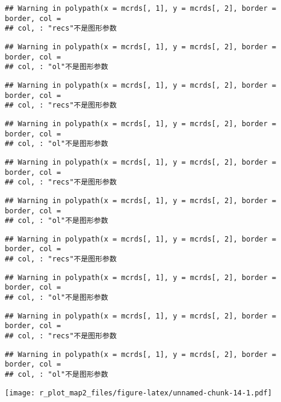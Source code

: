 \documentclass[]{article}
\begin{document}
\begin{verbatim}
## Warning in polypath(x = mcrds[, 1], y = mcrds[, 2], border = border, col =
## col, : "recs"不是图形参数
\end{verbatim}

\begin{verbatim}
## Warning in polypath(x = mcrds[, 1], y = mcrds[, 2], border = border, col =
## col, : "ol"不是图形参数
\end{verbatim}

\begin{verbatim}
## Warning in polypath(x = mcrds[, 1], y = mcrds[, 2], border = border, col =
## col, : "recs"不是图形参数
\end{verbatim}

\begin{verbatim}
## Warning in polypath(x = mcrds[, 1], y = mcrds[, 2], border = border, col =
## col, : "ol"不是图形参数
\end{verbatim}

\begin{verbatim}
## Warning in polypath(x = mcrds[, 1], y = mcrds[, 2], border = border, col =
## col, : "recs"不是图形参数
\end{verbatim}

\begin{verbatim}
## Warning in polypath(x = mcrds[, 1], y = mcrds[, 2], border = border, col =
## col, : "ol"不是图形参数
\end{verbatim}

\begin{verbatim}
## Warning in polypath(x = mcrds[, 1], y = mcrds[, 2], border = border, col =
## col, : "recs"不是图形参数
\end{verbatim}

\begin{verbatim}
## Warning in polypath(x = mcrds[, 1], y = mcrds[, 2], border = border, col =
## col, : "ol"不是图形参数
\end{verbatim}

\begin{verbatim}
## Warning in polypath(x = mcrds[, 1], y = mcrds[, 2], border = border, col =
## col, : "recs"不是图形参数
\end{verbatim}

\begin{verbatim}
## Warning in polypath(x = mcrds[, 1], y = mcrds[, 2], border = border, col =
## col, : "ol"不是图形参数
\end{verbatim}

\texttt{[image: r\_plot\_map2\_files/figure-latex/unnamed-chunk-14-1.pdf]}
\end{document}

